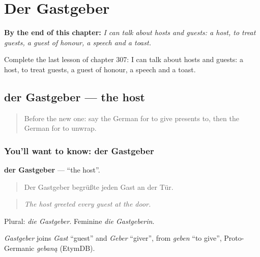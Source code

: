 
\chapter{Der Gastgeber}
\label{ch:ge-der-gastgeber}

\begin{chapteropening}
\textbf{By the end of this chapter:} \emph{I can talk about hosts and guests: a host, to treat guests, a guest of honour, a speech and a toast.}

Complete the last lesson of chapter 307: I can talk about hosts and guests: a host, to treat guests, a guest of honour, a speech and a toast.
\end{chapteropening}

\section[der Gastgeber]{der Gastgeber — the host}

\label{lesson:GE-C307-gastgeber}



\begin{quote}
Before the new one: say the German for to give presents to, then the German for to unwrap.
\end{quote}

\subsection*{You'll want to know: der Gastgeber}
\textbf{der Gastgeber} — \textquotedblleft{}the host\textquotedblright{}.

\begin{quote}
Der Gastgeber begrüßte jeden Gast an der Tür.
\end{quote}

\begin{quote}
\emph{The host greeted every guest at the door.}
\end{quote}

Plural: \emph{die Gastgeber}. Feminine \emph{die Gastgeberin}.

\begin{cousinweb}
\emph{Gastgeber} joins \emph{Gast} \textquotedblleft{}guest\textquotedblright{} and \emph{Geber} \textquotedblleft{}giver\textquotedblright{}, from \emph{geben} \textquotedblleft{}to give\textquotedblright{}, Proto-Germanic \emph{gebaną} (EtymDB).
\end{cousinweb}

